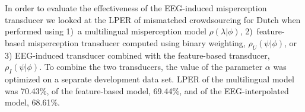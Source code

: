 In order to evaluate the effectiveness of the EEG-induced misperception 
transducer we looked at the LPER of mismatched crowdsourcing
for Dutch when performed using 1)~a multilingual misperception
model $\rho(\lambda|\phi)$,
2)~feature-based misperception transducer computed using binary 
weighting, $\rho_U(\psi|\phi)$, or 3) EEG-induced transducer combined with 
the feature-based transducer, $\rho_I(\psi|\phi)$. To combine the two 
transducers, the value of the parameter $\alpha$ was optimized on a 
separate development data set.
LPER of the multilingual model was 70.43\%, of the feature-based model,
69.44\%, and of the EEG-interpolated model, 68.61\%.



